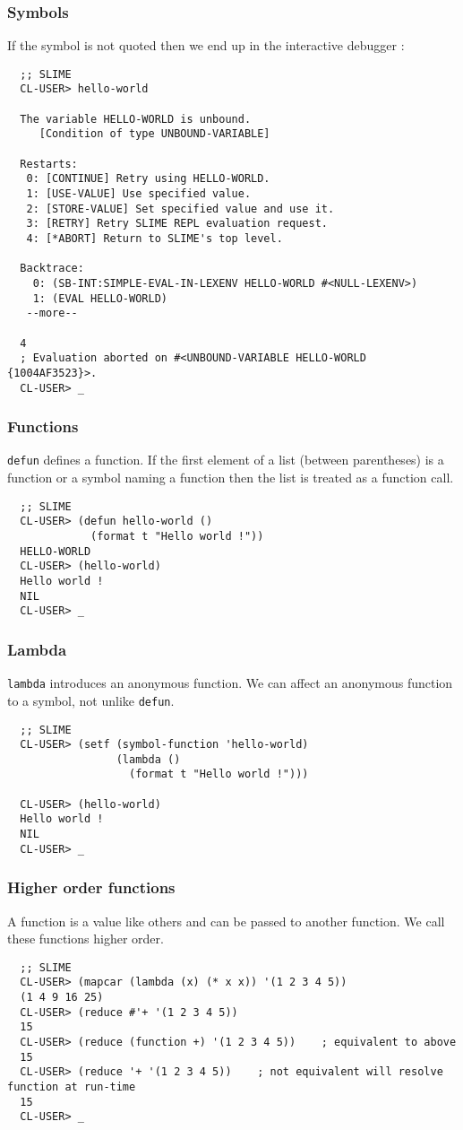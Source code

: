 \documentclass[8pt]{beamer}
\begin{document}
\begin{frame}[fragile]
  \frametitle{Symbols}
  If the symbol is not quoted then we end up in the interactive debugger :
\begin{verbatim}
  ;; SLIME
  CL-USER> hello-world
  
  The variable HELLO-WORLD is unbound.
     [Condition of type UNBOUND-VARIABLE]
  
  Restarts:
   0: [CONTINUE] Retry using HELLO-WORLD.
   1: [USE-VALUE] Use specified value.
   2: [STORE-VALUE] Set specified value and use it.
   3: [RETRY] Retry SLIME REPL evaluation request.
   4: [*ABORT] Return to SLIME's top level.
  
  Backtrace:
    0: (SB-INT:SIMPLE-EVAL-IN-LEXENV HELLO-WORLD #<NULL-LEXENV>)
    1: (EVAL HELLO-WORLD)
   --more--
  
  4
  ; Evaluation aborted on #<UNBOUND-VARIABLE HELLO-WORLD {1004AF3523}>.
  CL-USER> _
\end{verbatim}
\end{frame}

\begin{frame}[fragile]
  \frametitle{Functions}
  {\tt defun} defines a function.
  If the first element of a list (between parentheses) is a function or a symbol naming a function then the list is treated as a function call.
\begin{verbatim}
  ;; SLIME
  CL-USER> (defun hello-world ()
             (format t "Hello world !"))
  HELLO-WORLD
  CL-USER> (hello-world)
  Hello world !
  NIL
  CL-USER> _
\end{verbatim}
\end{frame}

\begin{frame}[fragile]
  \frametitle{Lambda}
  {\tt lambda} introduces an anonymous function. We can affect an anonymous function to a symbol, not unlike {\tt defun}.
\begin{verbatim}
  ;; SLIME
  CL-USER> (setf (symbol-function 'hello-world)
                 (lambda ()
                   (format t "Hello world !")))
  
  CL-USER> (hello-world)
  Hello world !
  NIL
  CL-USER> _
\end{verbatim}
\end{frame}

\begin{frame}[fragile]
  \frametitle{Higher order functions}
  A function is a value like others and can be passed to another function. We call these functions higher order.
\begin{verbatim}
  ;; SLIME
  CL-USER> (mapcar (lambda (x) (* x x)) '(1 2 3 4 5))
  (1 4 9 16 25)
  CL-USER> (reduce #'+ '(1 2 3 4 5))
  15
  CL-USER> (reduce (function +) '(1 2 3 4 5))    ; equivalent to above
  15
  CL-USER> (reduce '+ '(1 2 3 4 5))    ; not equivalent will resolve function at run-time
  15
  CL-USER> _
\end{verbatim}
\end{frame}
\end{document}
